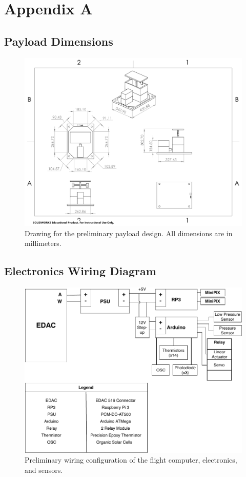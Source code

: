 \newpage
\section{Appendix A}
\label{sec:Appendix A}

\subsection{Payload Dimensions}
\begin{figure}[!h]
  \centering
  \includegraphics[width=\textwidth]{./Figures/PayloadDrawing.pdf}
  \caption{Drawing for the preliminary payload design. All dimensions are in millimeters.}
  \label{fig:PayloadDimensions} 
\end{figure}

\newpage

\subsection{Electronics Wiring Diagram}
\begin{figure}[!h]
  \centering
  \includegraphics[width=\textwidth]{./Figures/WiringDiagram.pdf}
  \caption{Preliminary wiring configuration of the flight computer, electronics, and sensors.}
  \label{fig:WiringDiagram}
\end{figure}
